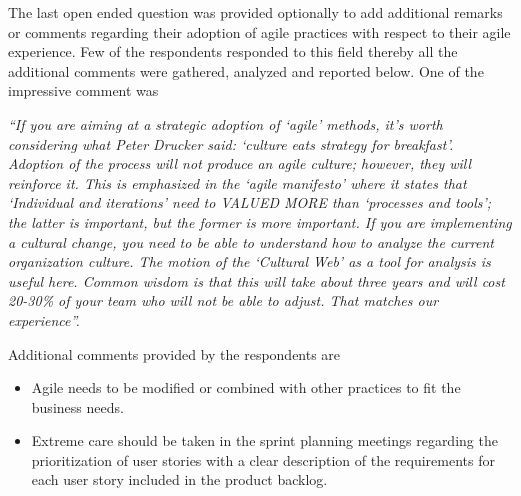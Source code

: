 \documentclass[a4paper,oneside]{bth}
\begin{document}
The last open ended question was provided optionally to add additional remarks or comments regarding their adoption of agile practices with respect to their agile experience. Few of the respondents responded to this field thereby all the additional comments were gathered, analyzed and reported below. One of the impressive comment was 

\textit{“If you are aiming at a strategic adoption of ‘agile’ methods, it’s worth considering what Peter Drucker said: ‘culture eats strategy for breakfast’. Adoption of the process will not produce an agile culture; however, they will reinforce it. This is emphasized in the ‘agile manifesto’ where it states that ‘Individual and iterations’ need to VALUED MORE than ‘processes and tools’; the latter is important, but the former is more important. If you are implementing a cultural change, you need to be able to understand how to analyze the current organization culture. The motion of the ‘Cultural Web’ as a tool for analysis is useful here. Common wisdom is that this will take about three years and will cost 20-30\% of your team who will not be able to adjust. That matches our experience”.}

Additional comments provided by the respondents are
\begin{itemize}
\item	Agile needs to be modified or combined with other practices to fit the business needs.
\item Extreme care should be taken in the sprint planning meetings regarding the prioritization of user stories with a clear description of the requirements for each user story included in the product backlog. 
\end{itemize}
\end{document}
